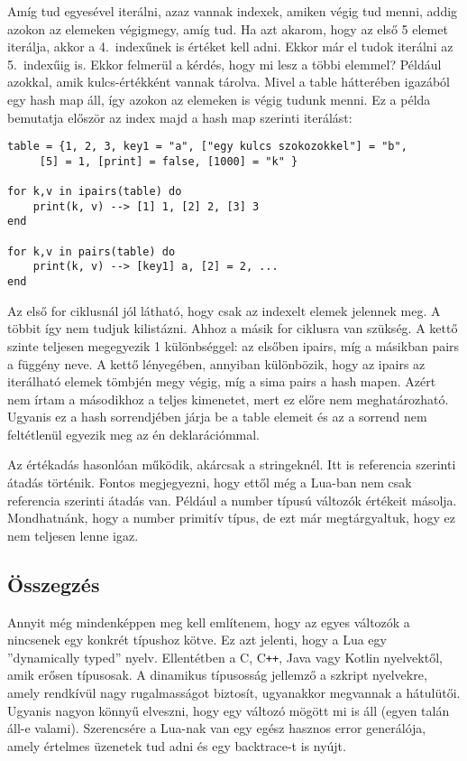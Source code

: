 Amíg tud egyesével iterálni, azaz vannak indexek, amiken végig tud menni, addig azokon az elemeken végigmegy, amíg tud. Ha azt akarom, hogy az első 5 elemet iterálja, akkor a 4.~indexűnek is értéket kell adni. Ekkor már el tudok iterálni az 5.~indexűig is. Ekkor felmerül a kérdés, hogy mi lesz a többi elemmel? Például azokkal, amik kulcs-értékként vannak tárolva. Mivel a table hátterében igazából egy hash map áll, így azokon az elemeken is végig tudunk menni. Ez a példa bemutatja először az index majd a hash map szerinti iterálást:
\scriptsize
\begin{lstlisting}
table = {1, 2, 3, key1 = "a", ["egy kulcs szokozokkel"] = "b",
	 [5] = 1, [print] = false, [1000] = "k" }

for k,v in ipairs(table) do
	print(k, v) --> [1] 1, [2] 2, [3] 3
end

for k,v in pairs(table) do
	print(k, v) --> [key1] a, [2] = 2, ...
end
\end{lstlisting}
\normalsize
Az első for ciklusnál jól látható, hogy csak az indexelt elemek jelennek meg. A többit így nem tudjuk kilistázni. Ahhoz a másik for ciklusra van szükség. A kettő szinte teljesen megegyezik 1 különbséggel: az elsőben ipairs, míg a másikban pairs a függény neve. A kettő lényegében, annyiban különbözik, hogy az ipairs az iterálható elemek tömbjén megy végig, míg a sima pairs a hash mapen. Azért nem írtam a másodikhoz a teljes kimenetet, mert ez előre nem meghatározható. Ugyanis ez a hash sorrendjében járja be a table elemeit és az a sorrend nem feltétlenül egyezik meg az én deklarációmmal. 

Az értékadás hasonlóan működik, akárcsak a stringeknél. Itt is referencia szerinti átadás történik. Fontos megjegyezni, hogy ettől még a Lua-ban nem csak referencia szerinti átadás van. Például a number típusú változók értékeit másolja. Mondhatnánk, hogy a number primitív típus, de ezt már megtárgyaltuk, hogy ez nem teljesen lenne igaz. 


\subsection{Összegzés}

Annyit még mindenképpen meg kell említenem, hogy az egyes változók a nincsenek egy konkrét típushoz kötve. Ez azt jelenti, hogy a Lua egy ''dynamically typed'' nyelv. Ellentétben a C, C\verb|++|, Java vagy Kotlin nyelvektől, amik erősen típusosak. A dinamikus típusosság jellemző a szkript nyelvekre, amely rendkívül nagy rugalmasságot biztosít, ugyanakkor megvannak a hátulütői. Ugyanis nagyon könnyű elveszni, hogy egy változó mögött mi is áll (egyen talán áll-e valami). Szerencsére a Lua-nak van egy egész hasznos error generálója, amely értelmes üzenetek tud adni és egy backtrace-t is nyújt.



